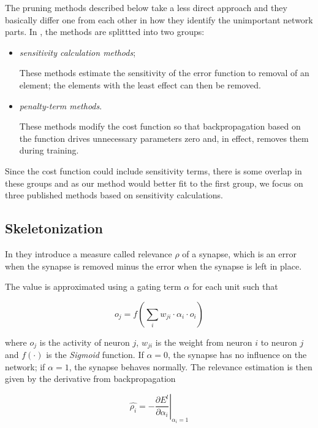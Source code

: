 The pruning methods described below take a less direct approach and they basically differ one from each other in how they identify the unimportant network parts. In \citep{reed:pa_survey}, the methods are splittted into two groups:
\begin{itemize}
\item \textit{sensitivity calculation methods};

These methods estimate the sensitivity of the error function to removal of an element; the elements with the least effect can then be removed.
 
\item \textit{penalty-term methods}.

These methods modify the cost function so that backpropagation based on the function drives unnecessary parameters zero and, in effect, removes them during training.
\end{itemize}

Since the cost function could include sensitivity terms, there is some overlap in these groups and as our method would better fit to the first group, we focus on three published methods based on sensitivity calculations.

\subsection*{Skeletonization} \label{ssec:skeletonization}
In \citep{mozer:skeletonization} they introduce a measure called relevance $ \rho $ of a synapse, which is an error when the synapse is removed minus the error when the synapse is left in place.

The value is approximated using a gating term $ \alpha $ for each unit such that

\begin{equation}
o_j = f(\displaystyle{\sum_i w_{ji} \cdot \alpha_i \cdot o_i})
\end{equation}

where $ o_j $ is the activity of neuron $ j $, $ w_{ji} $ is the weight from neuron $ i $ to neuron $ j $ and $ f(\cdot) $ is the \textit{Sigmoid} function. If $ \alpha = 0 $, the synapse has no influence on the network; if $ \alpha = 1 $, the synapse behaves normally. The relevance estimation is then given by the derivative from backpropagation

\begin{equation}
\hat{\rho_i} = - \left.\frac{\partial E^l}{\partial \alpha_i}\right\rvert_{\alpha_i = 1}
\end{equation}


